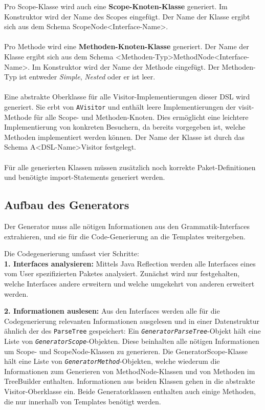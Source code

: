 \noindent
Pro Scope-Klasse wird auch eine \textbf{Scope-Knoten-Klasse} generiert. Im Konstruktor wird der Name des Scopes eingefügt. Der Name der Klasse ergibt sich aus dem Schema ScopeNode<Interface-Name>.
\\ \\
\noindent
Pro Methode wird eine \textbf{Methoden-Knoten-Klasse} generiert.
Der Name der Klasse ergibt sich aus dem Schema <Methoden-Typ>MethodNode<Interface-Name>. Im Konstruktor wird der Name der Methode eingefügt. Der Methoden-Typ ist entweder \emph{Simple}, \emph{Nested} oder er ist leer.
\\ \\
\noindent
Eine abstrakte Oberklasse für alle Visitor-Implementierungen dieser DSL wird generiert. Sie erbt von \texttt{AVisitor} und enthält leere Implementierungen der visit-Methode für alle Scope- und Methoden-Knoten. Dies ermöglicht eine leichtere Implementierung von konkreten Besuchern, da bereits vorgegeben ist, welche Methoden implementiert werden können. Der Name der Klasse ist durch das Schema A<DSL-Name>Visitor festgelegt.
\\ \\
Für alle generierten Klassen müssen zusätzlich noch korrekte Paket-Definitionen und benötigte import-Statements generiert werden.

\subsection{Aufbau des Generators}\label{ssct:5.2.2:generator}
Der Generator muss alle nötigen Informationen aus den Grammatik-Interfaces extrahieren, und sie für die Code-Generierung an die Templates weitergeben.

Die Codegenerierung umfasst vier Schritte:\\

\textbf{1. Interfaces analysieren:} Mittels Java Reflection werden alle Interfaces eines vom User spezifizierten Paketes analysiert. Zunächst wird nur festgehalten, welche Interfaces andere erweitern und welche umgekehrt von anderen erweitert werden.

\textbf{2. Informationen auslesen:} Aus den Interfaces werden alle für die Codegenerierung relevanten Informationen ausgelesen und in einer Datenstruktur ähnlich der des \texttt{ParseTree} gespeichert: Ein \emph{\texttt{GeneratorParseTree}}-Objekt hält eine Liste von  \emph{\texttt{GeneratorScope}}-Objekten. Diese beinhalten alle nötigen Informationen um Scope- und ScopeNode-Klassen zu generieren. Die GeneratorScope-Klasse hält eine Liste von \emph{\texttt{GeneratorMethod}}-Objekten, welche wiederum die Informationen zum Generieren von MethodNode-Klassen und von Methoden im TreeBuilder enthalten. Informationen aus beiden Klassen gehen in die abstrakte Visitor-Oberklasse ein. Beide Generatorklassen enthalten auch einige Methoden, die nur innerhalb von Templates benötigt werden.

